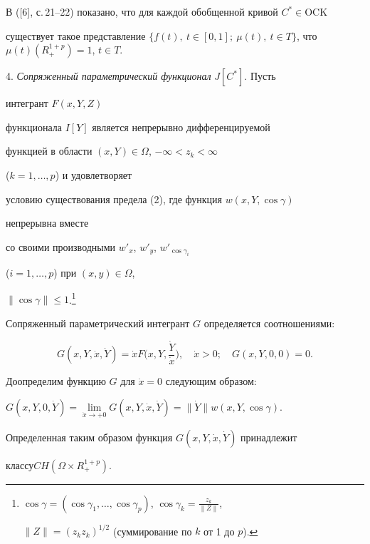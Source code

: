 В ([6], с.\,21--22) показано, что для каждой обобщенной кривой $C^*\in 


\mathrm{OCK}$ 


существует такое представление $\{f(t),\ t\in[0,1];\ \mu(t),\ t\in 


T\}$, что $\mu(t)(R^{1+p}_+)=1$, $t\in T$. 


 


4. {\it Сопряженный параметрический функционал} $J[C^*]$. Пусть 


интегрант $F(x,Y,Z)$ 


функционала $I[Y]$ является непрерывно дифференцируемой 


функцией в области $(x,Y)\in\Omega$, $-\infty<z_k<\infty$ 


($k=1,\dotsc,p$) и удовлетворяет 


условию существования предела (2), где функция $w(x,Y,\cos\gamma)$ 


непрерывна вместе 


со своими производными $w'_x$, $w'_y$, $w'_{\cos\gamma_i}$ 


($i=1,\dotsc,p$) при $(x,y)\in\Omega$, 


$\|\cos\gamma\|\le1$.\footnote{$\cos\gamma=(\cos\gamma_1,\dotsc, 


\cos\gamma_p)$, $\cos\gamma_k=\frac{z_k}{\|Z\|}$, 


$\|Z\|=(z_k{}z_k)^{1/2}$ (суммирование по $k$ от 1 до $p$).} 


 


Сопряженный параметрический интегрант $G$ определяется соотношениями: 


$$ 


G(x,Y,\Dot x,\Dot Y)=\Dot x F 


\bigg(x,Y,\frac{\Dot Y}{\Dot x} \bigg),\quad 


\Dot x>0;\quad G(x,Y,0,0)=0. 


$$ 


Доопределим функцию $G$ для $\Dot x=0$ следующим образом: 


$G(x,Y,0,\Dot Y)=\lim\limits_{\Dot x\to+0}G(x,Y,\Dot x,\Dot Y)=\|\Dot 


Y\|w(x,Y,\cos\gamma)$. 


Определенная таким образом функция $G(x,Y,\Dot x,\Dot Y)$ принадлежит 


классу\linebreak $CH(\Omega\times R^{1+p}_+)$. 


